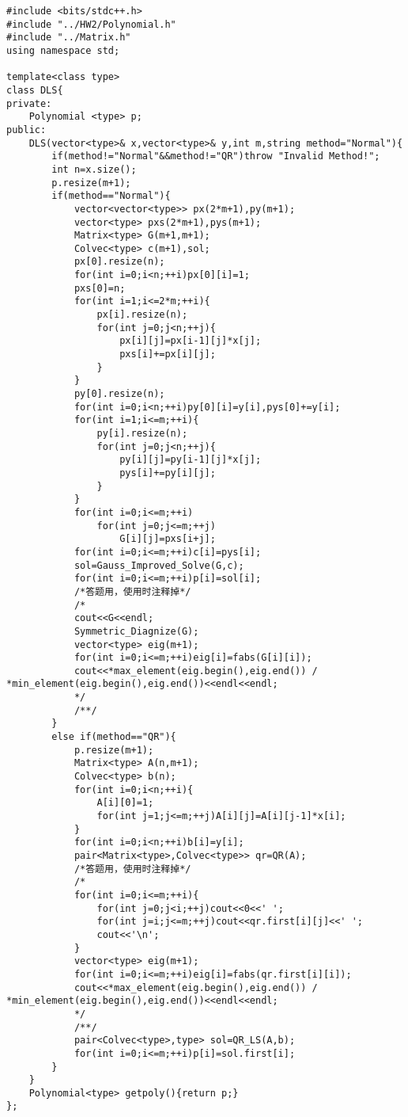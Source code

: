 \documentclass{ctexart}
\begin{document}
\begin{verbatim}
#include <bits/stdc++.h>
#include "../HW2/Polynomial.h"
#include "../Matrix.h"
using namespace std;

template<class type>
class DLS{
private:
    Polynomial <type> p;
public:
    DLS(vector<type>& x,vector<type>& y,int m,string method="Normal"){
        if(method!="Normal"&&method!="QR")throw "Invalid Method!";
        int n=x.size();
        p.resize(m+1);
        if(method=="Normal"){
            vector<vector<type>> px(2*m+1),py(m+1);
            vector<type> pxs(2*m+1),pys(m+1);
            Matrix<type> G(m+1,m+1);
            Colvec<type> c(m+1),sol;
            px[0].resize(n);
            for(int i=0;i<n;++i)px[0][i]=1;
            pxs[0]=n;
            for(int i=1;i<=2*m;++i){
                px[i].resize(n);
                for(int j=0;j<n;++j){
                    px[i][j]=px[i-1][j]*x[j];
                    pxs[i]+=px[i][j];
                }
            }
            py[0].resize(n);
            for(int i=0;i<n;++i)py[0][i]=y[i],pys[0]+=y[i];
            for(int i=1;i<=m;++i){
                py[i].resize(n);
                for(int j=0;j<n;++j){
                    py[i][j]=py[i-1][j]*x[j];
                    pys[i]+=py[i][j];
                }
            }
            for(int i=0;i<=m;++i)
                for(int j=0;j<=m;++j)
                    G[i][j]=pxs[i+j];
            for(int i=0;i<=m;++i)c[i]=pys[i];
            sol=Gauss_Improved_Solve(G,c);
            for(int i=0;i<=m;++i)p[i]=sol[i];
            /*答题用，使用时注释掉*/
            /*
            cout<<G<<endl;
            Symmetric_Diagnize(G);
            vector<type> eig(m+1);
            for(int i=0;i<=m;++i)eig[i]=fabs(G[i][i]);
            cout<<*max_element(eig.begin(),eig.end()) / *min_element(eig.begin(),eig.end())<<endl<<endl;
            */
            /**/
        }
        else if(method=="QR"){
            p.resize(m+1);
            Matrix<type> A(n,m+1);
            Colvec<type> b(n);
            for(int i=0;i<n;++i){
                A[i][0]=1;
                for(int j=1;j<=m;++j)A[i][j]=A[i][j-1]*x[i];
            }
            for(int i=0;i<n;++i)b[i]=y[i];
            pair<Matrix<type>,Colvec<type>> qr=QR(A);
            /*答题用，使用时注释掉*/
            /*
            for(int i=0;i<=m;++i){
                for(int j=0;j<i;++j)cout<<0<<' ';
                for(int j=i;j<=m;++j)cout<<qr.first[i][j]<<' ';
                cout<<'\n';
            }
            vector<type> eig(m+1);
            for(int i=0;i<=m;++i)eig[i]=fabs(qr.first[i][i]);
            cout<<*max_element(eig.begin(),eig.end()) / *min_element(eig.begin(),eig.end())<<endl<<endl;
            */
            /**/
            pair<Colvec<type>,type> sol=QR_LS(A,b);
            for(int i=0;i<=m;++i)p[i]=sol.first[i];
        }
    }
    Polynomial<type> getpoly(){return p;}
};
\end{verbatim}
\end{document}
